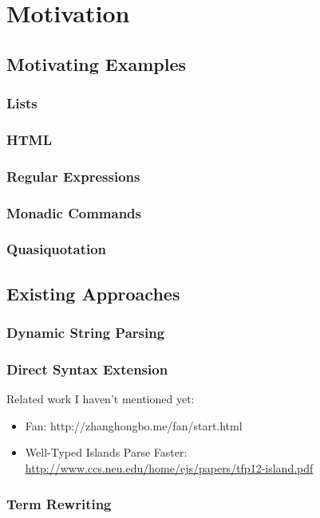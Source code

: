 
\chapter{Motivation}
\section{Motivating Examples}
\subsection{Lists}
\subsection{HTML}
\subsection{Regular Expressions}
\subsection{Monadic Commands}
\subsection{Quasiquotation}
\section{Existing Approaches}
\subsection{Dynamic String Parsing}
\subsection{Direct Syntax Extension}

Related work I haven't mentioned yet:
\begin{itemize}
\item Fan: http://zhanghongbo.me/fan/start.html
\item Well-Typed Islands Parse Faster: \\\url{http://www.ccs.neu.edu/home/ejs/papers/tfp12-island.pdf}
\end{itemize}
\subsection{Term Rewriting}